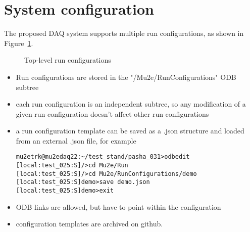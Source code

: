 \section{System configuration}

The proposed DAQ system supports multiple run configurations,
as shown in Figure~\ref{figure:run_configurations}.

\begin{figure}[H]
  \caption{
    \label{figure:run_configurations}
    Top-level run configurations
  }
\end{figure}

\begin{itemize}
\item 
  Run configurations are stored in the "/Mu2e/RunConfigurations" ODB subtree
\item
  each run configuration is an independent subtree, so any modification
  of a given run configuration doesn't affect other run configurations
\item
  a run configuration template can be saved as a .json structure and loaded from
  an external .json file, for example
\begin{verbatim}
mu2etrk@mu2edaq22:~/test_stand/pasha_031>odbedit
[local:test_025:S]/>cd Mu2e/Run
[local:test_025:S]/>cd Mu2e/RunConfigurations/demo
[local:test_025:S]demo>save demo.json
[local:test_025:S]demo>exit
\end{verbatim}
\item
  ODB links are allowed, but have to point within the configuration
\item
  configuration templates are archived on github. 
\end{itemize}

